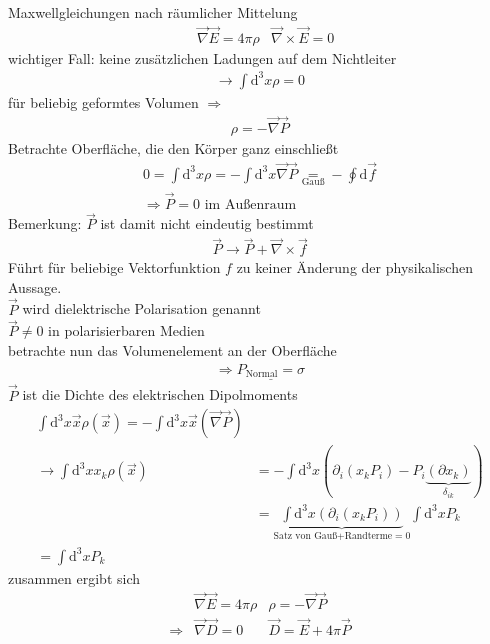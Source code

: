 \documentclass[a4paper]{article}
\begin{document}
Maxwellgleichungen nach räumlicher Mittelung
\begin{align}
&\vec{\nabla}\vec{E}=4\pi\rho&\vec{\nabla}\times\vec{E}=0 
\end{align}
wichtiger Fall: keine zusätzlichen Ladungen auf dem Nichtleiter
\begin{align}
\rightarrow \int \mathrm{d}^3x \rho =0
\end{align}
für beliebig geformtes Volumen $\Rightarrow$
\begin{align}
\rho=-\vec{\nabla}\vec{P}
\end{align}
Betrachte Oberfläche, die den Körper ganz einschließt
 \begin{align}
 0=\int \mathrm{d}^3x\rho=-\int \mathrm{d}^3x \vec{\nabla}\vec{P}\underset{\text{Gauß}}{=}-\oint
 \mathrm{d}\vec{f}\\
 \Rightarrow
 \vec{P}=0 \text{ im Außenraum}
 \end{align}
Bemerkung: $\vec{P}$ ist damit nicht eindeutig bestimmt
\begin{align}
\vec{P}\rightarrow \vec{P}+\vec{\nabla}\times\vec{f} 
\end{align}
Führt für beliebige Vektorfunktion $f$ zu keiner Änderung der physikalischen
Aussage. \\
$\vec{P}$ wird dielektrische Polarisation genannt\\
$\vec{P}\neq0$ in polarisierbaren Medien\\
betrachte nun das Volumenelement an der Oberfläche
\begin{align}
\Rightarrow \underline{P_{\text{Normal}}=\sigma}
\end{align} 
$\vec{P}$ ist die Dichte des elektrischen Dipolmoments
\begin{align}
\int \mathrm{d}^3x \vec{x}\rho(\vec{x})=-\int \mathrm{d}^3x \vec{x}(\vec{\nabla}\vec{P})\\
\rightarrow \int \mathrm{d}^3\!x x_k\rho(\vec{x})&=-\int \mathrm{d}^3x
\left(\partial_i(x_kP_i)-P_i\underbrace{(\partial x_k)}_{\delta_{ik}}\right)\\
&=\underbrace{\int \mathrm{d}^3x\left(\partial_i(x_kP_i)\right)}_{\text{Satz von
Gauß+Randterme}=0} \int \mathrm{d}^3x P_k\\
=\int \mathrm{d}^3x P_k
\end{align}
zusammen ergibt sich
\begin{align}
&\vec{\nabla}\vec{E}=4\pi\rho &\rho=-\vec{\nabla}\vec{P}\\
\Rightarrow &\vec{\nabla}\vec{D}=0 & \vec{D}=\vec{E}+4\pi\vec{P}
\end{align}
\end{document}
